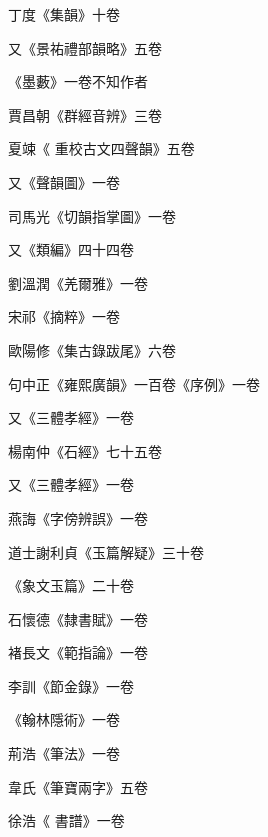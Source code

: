 \begin{pinyinscope}
 丁度《集韻》十卷



 又《景祐禮部韻略》五卷



 《墨藪》一卷不知作者



 賈昌朝《群經音辨》三卷



 夏竦《
 重校古文四聲韻》五卷



 又《聲韻圖》一卷



 司馬光《切韻指掌圖》一卷



 又《類編》四十四卷



 劉溫潤《羌爾雅》一卷



 宋祁《摘粹》一卷



 歐陽修《集古錄跋尾》六卷



 句中正《雍熙廣韻》一百卷《序例》一卷



 又《三體孝經》一卷



 楊南仲《石經》七十五卷



 又《三體孝經》一卷



 燕誨《字傍辨誤》一卷



 道士謝利貞《玉篇解疑》三十卷



 《象文玉篇》二十卷



 石懷德《隸書賦》一卷



 褚長文《範指論》一卷



 李訓《節金錄》一卷



 《翰林隱術》一卷



 荊浩《筆法》一卷



 韋氏《筆寶兩字》五卷



 徐浩《
 書譜》一卷




\end{pinyinscope}
